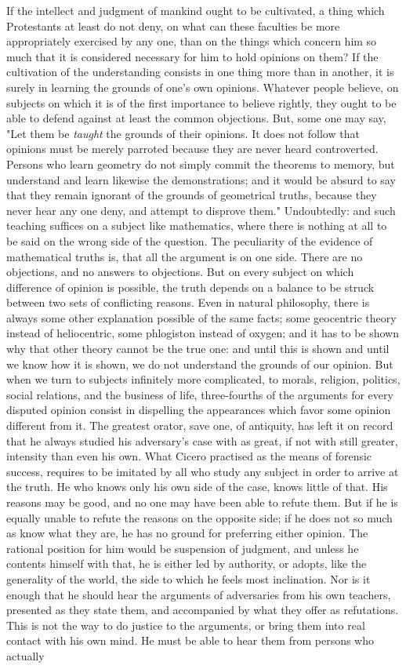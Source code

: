 \documentclass[12pt]{report}
\begin{document}
If the intellect and judgment of mankind ought to be cultivated, a thing which Protestants at least do not deny, on what can these faculties be more appropriately exercised by any one, than on the things which concern him so much that it is considered necessary for him to hold opinions on them? If the cultivation of the understanding consists in one thing more than in another, it is surely in learning the grounds of one's own opinions. Whatever people believe, on subjects on which it is of the first importance to believe rightly, they ought to be able to defend against at least the common objections. But, some one may say, "Let them be \emph{taught} the grounds of their opinions. It does not follow that opinions must be merely parroted because they are never heard controverted. Persons who learn geometry do not simply commit the theorems to memory, but understand and learn likewise the demonstrations; and it would be absurd to say that they remain ignorant of the grounds of geometrical truths, because they never hear any one deny, and attempt to disprove them." Undoubtedly: and such teaching suffices on a subject like mathematics, where there is nothing at all to be said on the wrong side of the question. The peculiarity of the evidence of mathematical truths is, that all the argument is on one side. There are no objections, and no answers to objections. But on every subject on which difference of opinion is possible, the truth depends on a balance to be struck between two sets of conflicting reasons. Even in natural philosophy, there is always some other explanation possible of the same facts; some geocentric theory instead of heliocentric, some phlogiston instead of oxygen; and it has to be shown why that other theory cannot be the true one: and until this is shown and until we know how it is shown, we do not understand the grounds of our opinion. But when we turn to subjects infinitely more complicated, to morals, religion, politics, social relations, and the business of life, three-fourths of the arguments for every disputed opinion consist in dispelling the appearances which favor some opinion different from it. The greatest orator, save one, of antiquity, has left it on record that he always studied his adversary's case with as great, if not with still greater, intensity than even his own. What Cicero practised as the means of forensic success, requires to be imitated by all who study any subject in order to arrive at the truth. He who knows only his own side of the case, knows little of that. His reasons may be good, and no one may have been able to refute them. But if he is equally unable to refute the reasons on the opposite side; if he does not so much as know what they are, he has no ground for preferring either opinion. The rational position for him would be suspension of judgment, and unless he contents himself with that, he is either led by authority, or adopts, like the generality of the world, the side to which he feels most inclination. Nor is it enough that he should hear the arguments of adversaries from his own teachers, presented as they state them, and accompanied by what they offer as refutations. This is not the way to do justice to the arguments, or bring them into real contact with his own mind. He must be able to hear them from persons who actually 
\end{document}
